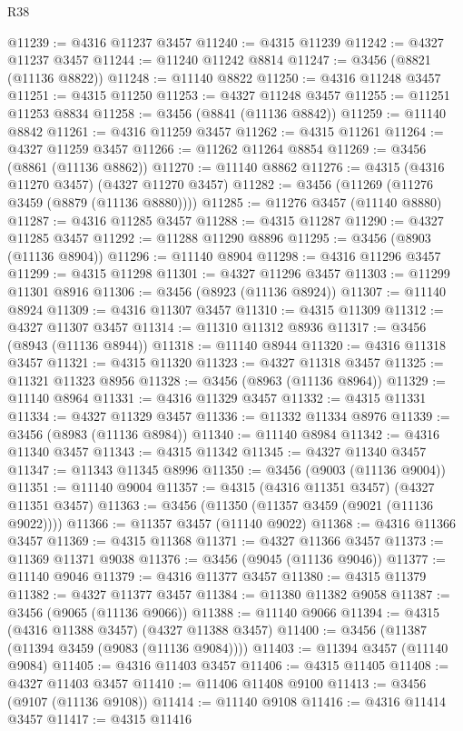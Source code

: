 \begin{lexlean}{R38}
\begin{coremodule}
@11239 := @4316 @11237 @3457
@11240 := @4315 @11239
@11242 := @4327 @11237 @3457
@11244 := @11240 @11242 @8814
@11247 := @3456 (@8821 (@11136 @8822))
@11248 := @11140 @8822
@11250 := @4316 @11248 @3457
@11251 := @4315 @11250
@11253 := @4327 @11248 @3457
@11255 := @11251 @11253 @8834
@11258 := @3456 (@8841 (@11136 @8842))
@11259 := @11140 @8842
@11261 := @4316 @11259 @3457
@11262 := @4315 @11261
@11264 := @4327 @11259 @3457
@11266 := @11262 @11264 @8854
@11269 := @3456 (@8861 (@11136 @8862))
@11270 := @11140 @8862
@11276 := @4315 (@4316 @11270 @3457) (@4327 @11270 @3457)
@11282 := @3456 (@11269 (@11276 @3459 (@8879 (@11136 @8880))))
@11285 := @11276 @3457 (@11140 @8880)
@11287 := @4316 @11285 @3457
@11288 := @4315 @11287
@11290 := @4327 @11285 @3457
@11292 := @11288 @11290 @8896
@11295 := @3456 (@8903 (@11136 @8904))
@11296 := @11140 @8904
@11298 := @4316 @11296 @3457
@11299 := @4315 @11298
@11301 := @4327 @11296 @3457
@11303 := @11299 @11301 @8916
@11306 := @3456 (@8923 (@11136 @8924))
@11307 := @11140 @8924
@11309 := @4316 @11307 @3457
@11310 := @4315 @11309
@11312 := @4327 @11307 @3457
@11314 := @11310 @11312 @8936
@11317 := @3456 (@8943 (@11136 @8944))
@11318 := @11140 @8944
@11320 := @4316 @11318 @3457
@11321 := @4315 @11320
@11323 := @4327 @11318 @3457
@11325 := @11321 @11323 @8956
@11328 := @3456 (@8963 (@11136 @8964))
@11329 := @11140 @8964
@11331 := @4316 @11329 @3457
@11332 := @4315 @11331
@11334 := @4327 @11329 @3457
@11336 := @11332 @11334 @8976
@11339 := @3456 (@8983 (@11136 @8984))
@11340 := @11140 @8984
@11342 := @4316 @11340 @3457
@11343 := @4315 @11342
@11345 := @4327 @11340 @3457
@11347 := @11343 @11345 @8996
@11350 := @3456 (@9003 (@11136 @9004))
@11351 := @11140 @9004
@11357 := @4315 (@4316 @11351 @3457) (@4327 @11351 @3457)
@11363 := @3456 (@11350 (@11357 @3459 (@9021 (@11136 @9022))))
@11366 := @11357 @3457 (@11140 @9022)
@11368 := @4316 @11366 @3457
@11369 := @4315 @11368
@11371 := @4327 @11366 @3457
@11373 := @11369 @11371 @9038
@11376 := @3456 (@9045 (@11136 @9046))
@11377 := @11140 @9046
@11379 := @4316 @11377 @3457
@11380 := @4315 @11379
@11382 := @4327 @11377 @3457
@11384 := @11380 @11382 @9058
@11387 := @3456 (@9065 (@11136 @9066))
@11388 := @11140 @9066
@11394 := @4315 (@4316 @11388 @3457) (@4327 @11388 @3457)
@11400 := @3456 (@11387 (@11394 @3459 (@9083 (@11136 @9084))))
@11403 := @11394 @3457 (@11140 @9084)
@11405 := @4316 @11403 @3457
@11406 := @4315 @11405
@11408 := @4327 @11403 @3457
@11410 := @11406 @11408 @9100
@11413 := @3456 (@9107 (@11136 @9108))
@11414 := @11140 @9108
@11416 := @4316 @11414 @3457
@11417 := @4315 @11416

\end{coremodule}
\end{lexlean}
